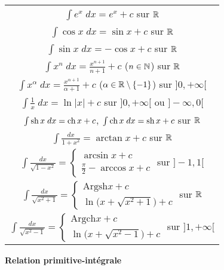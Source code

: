 \documentclass[10pt,class=article,crop=false]{standalone}
\begin{document}
\begin{multicols}{2}
\begin{center}
\setlength{\arrayrulewidth}{0.05mm}
\begin{tabular}{c@{\vrule depth 3ex height 1ex width 0mm \ }}	
	$\int e^x \; dx  = e^x + c$  \quad sur $\mathbb{R}$ \\ 
	$\int \cos x \; dx  = \sin x  + c$  \quad sur $\mathbb{R}$ \\ 
	$\int \sin x \; dx  = -\cos x  + c$  \quad sur $\mathbb{R}$ \\ 
	$\int x^n \; dx = \frac{x^{n+1}}{n+1} + c$  \quad ($n \in \mathbb{N}$)  \quad sur $\mathbb{R}$ \\ 
	$\int x^\alpha \; dx = \frac{x^{\alpha+1}}{\alpha+1} + c$  \quad ($\alpha \in \mathbb{R}\setminus\{-1\}$)  sur $]0,+\infty[$\\ 
	$\int \frac 1x \; dx  = \ln |x|  + c$  \quad sur $]0,+\infty[$ ou $]-\infty,0[$ \\ 
	$\int\operatorname{sh} x \; dx=\operatorname{ch} x+c$, $\int \operatorname{ch} x \; dx=\operatorname{sh} x+c$ \quad sur $\mathbb{R}$ \\ 
	$\int \frac{dx}{1+x^2}= \arctan x+c$ \quad sur $\mathbb{R}$ \\ 
	$\int\frac{dx}{\sqrt{1-x^2}} = \left\{ \begin{array}{l}
		\arcsin x + c \\ \frac\pi2-\arccos x +c \end{array} \right.$ \quad  sur $]-1,1[$ \\ 
	$\int \frac{dx}{\sqrt {x^2+1}}=  \left\{ \begin{array}{l} \mbox{Argsh} x+c \\
		\ln\big(x+\sqrt{x^2+1}\big)+c  \end{array} \right.$ \quad sur $\mathbb{R}$ \\
	$\int \frac{dx}{\sqrt {x^2-1}} = \left\{ \begin{array}{l} \mbox{Argch} x+c \\
		\ln\big(x+\sqrt{x^2-1}\big)+c \end{array} \right.$ \quad sur $]1,+ \infty[$\\ 
\end{tabular}
\end{center}



\textbf{Relation primitive-intégrale}


\end{multicols}
\end{document}
